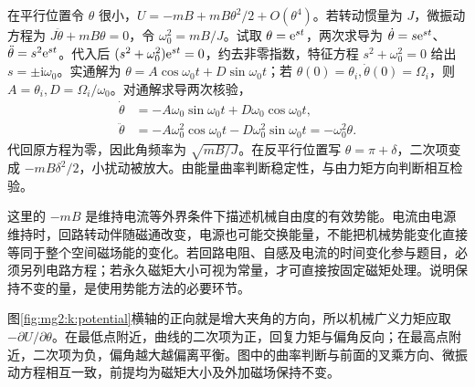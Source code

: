 在平行位置令 $\theta$ 很小，$U=-mB+mB\theta^2/2+O(\theta^4)$。若转动惯量为 $J$，微振动方程为 $J\ddot\theta+mB\theta=0$，令 $\omega_0^2=mB/J$。试取 $\theta=\mathrm e^{st}$，两次求导为 $\dot\theta=s\mathrm e^{st}$、$\ddot\theta=s^2\mathrm e^{st}$。代入后 $(s^2+\omega_0^2)\mathrm e^{st}=0$，约去非零指数，特征方程
$s^2+\omega_0^2=0$ 给出 $s=\pm\mathrm i\omega_0$。实通解为
$\theta=A\cos\omega_0t+D\sin\omega_0t$；若
$\theta(0)=\theta_i,\dot\theta(0)=\Omega_i$，则
$A=\theta_i,D=\Omega_i/\omega_0$。对通解求导两次核验，
\[
 \begin{aligned}
 \dot\theta&=-A\omega_0\sin\omega_0t+D\omega_0\cos\omega_0t,\\
 \ddot\theta&=-A\omega_0^2\cos\omega_0t-D\omega_0^2\sin\omega_0t
 =-\omega_0^2\theta.
 \end{aligned}
\]
代回原方程为零，因此角频率为 $\sqrt{mB/J}$。在反平行位置写 $\theta=\pi+\delta$，二次项变成 $-mB\delta^2/2$，小扰动被放大。由能量曲率判断稳定性，与由力矩方向判断相互检验。


这里的 $-mB$ 是维持电流等外界条件下描述机械自由度的有效势能。电流由电源维持时，回路转动伴随磁通改变，电源也可能交换能量，不能把机械势能变化直接等同于整个空间磁场能的变化。若回路电阻、自感及电流的时间变化参与题目，必须另列电路方程；若永久磁矩大小可视为常量，才可直接按固定磁矩处理。说明保持不变的量，是使用势能方法的必要环节。

图\ref{fig:mg2:k:potential}横轴的正向就是增大夹角的方向，所以机械广义力矩应取 $-\partial U/\partial\theta$。在最低点附近，曲线的二次项为正，回复力矩与偏角反向；在最高点附近，二次项为负，偏角越大越偏离平衡。图中的曲率判断与前面的叉乘方向、微振动方程相互一致，前提均为磁矩大小及外加磁场保持不变。



